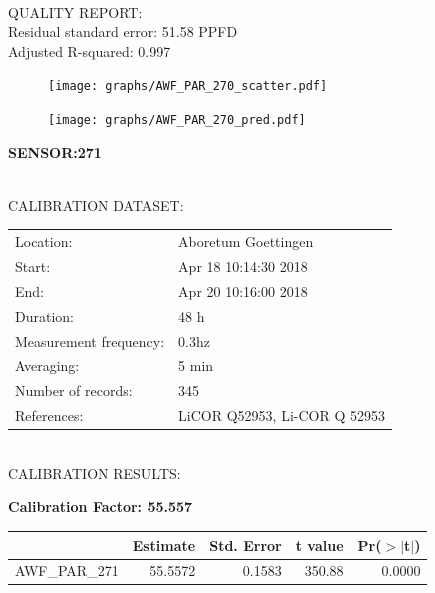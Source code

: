 \documentclass[oneside]{report}
\begin{document}
\hrulefill\\
QUALITY REPORT:\\
Residual standard error: 51.58 PPFD\\
Adjusted R-squared: 0.997



\begin{figure}[H]
  \centering
  \texttt{[image: graphs/AWF\_PAR\_270\_scatter.pdf]}
\end{figure}




\begin{figure}[H]
  \centering
  \texttt{[image: graphs/AWF\_PAR\_270\_pred.pdf]}
\end{figure}

\pagebreak


\begin{center}
\large{\textbf{SENSOR:271}}\\
\end{center}

\hrulefill\\
CALIBRATION DATASET:\\
\begin{table}[h!]
  \centering
  \label{tab:table1}
  \begin{tabular}{ll}
    Location: & Aboretum Goettingen\\ 
    
    
    Start:  & Apr 18 10:14:30 2018 \\
    End:   & Apr 20 10:16:00 2018\\ 
    Duration: & 48 h\\
    Measurement frequency: & 0.3hz\\
    Averaging:  &5 min\\
    Number of records: & 345 \\
    References: & LiCOR Q52953, Li-COR Q 52953 \\
  \end{tabular}
\end{table}

\hrulefill\\
CALIBRATION RESULTS:\\


\begin{center}
\textbf{\large{Calibration Factor: 55.557}}\\
\end{center}
\begin{table}[ht]
\centering
\begin{tabular}{rrrrr}
  \hline
 & Estimate & Std. Error & t value & Pr($>$$|$t$|$) \\ 
  \hline
AWF\_PAR\_271 & 55.5572 & 0.1583 & 350.88 & 0.0000 \\ 
   \hline
\end{tabular}
\end{table}
\end{document}
